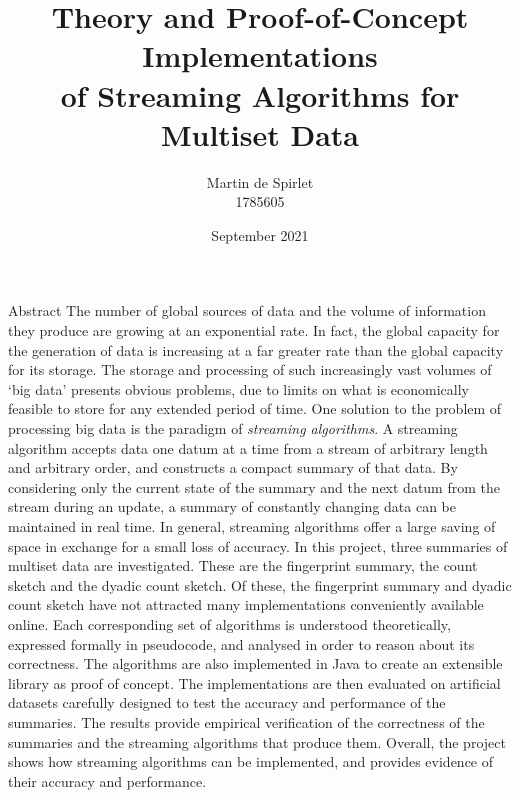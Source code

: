 \documentclass[
  10pt,
  a4paper,
  twoside,
  openright,
]{book}
\title{Theory and Proof-of-Concept Implementations \\ of Streaming Algorithms for Multiset Data}
\author{Martin de Spirlet \\ 1785605}
\date{September 2021}
\begin{document}
\maketitle

\pagestyle{fancy}

\frontmatter

\begin{frontsection}{Abstract}
  The number of global sources of data and the volume of information they produce are growing at an exponential rate.
  In fact, the global capacity for the generation of data is increasing at a far greater rate than the global capacity for its storage.
  The storage and processing of such increasingly vast volumes of `big data' presents obvious problems, due to limits on what is economically feasible to store for any extended period of time.
  One solution to the problem of processing big data is the paradigm of \emph{streaming algorithms}.
  A streaming algorithm accepts data one datum at a time from a stream of arbitrary length and arbitrary order, and constructs a compact summary of that data.
  By considering only the current state of the summary and the next datum from the stream during an update, a summary of constantly changing data can be maintained in real time.
  In general, streaming algorithms offer a large saving of space in exchange for a small loss of accuracy.
  In this project, three summaries of multiset data are investigated.
  These are the fingerprint summary, the count sketch and the dyadic count sketch.
  Of these, the fingerprint summary and dyadic count sketch have not attracted many implementations conveniently available online.
  Each corresponding set of algorithms is understood theoretically, expressed formally in pseudocode, and analysed in order to reason about its correctness.
  The algorithms are also implemented in Java to create an extensible library as proof of concept.
  The implementations are then evaluated on artificial datasets carefully designed to test the accuracy and performance of the summaries.
  The results provide empirical verification of the correctness of the summaries and the streaming algorithms that produce them.
  Overall, the project shows how streaming algorithms can be implemented, and provides evidence of their accuracy and performance.
\end{frontsection}

\tableofcontents

\mainmatter


\end{document}

